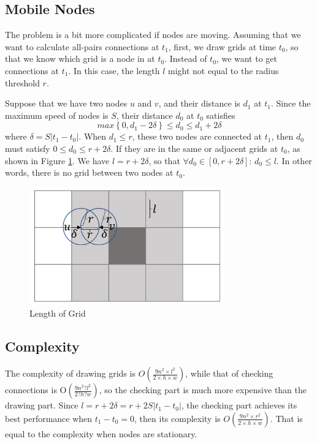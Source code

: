 \subsection{ Mobile Nodes}

\noindent The problem is a bit more complicated if nodes are moving. Assuming that we want to calculate all-pairs connections at $t_1$, first, we draw grids at time $t_0$, so that we know which grid is a node in at $t_0$. Instead of $t_0$, we want to get connections at $t_1$. In this case, the length $l$ might not equal to the radius threshold $r$.

Suppose that we have two nodes $u$ and $v$, and their distance is $d_1$ at $t_1$. Since the maximum speed of nodes is $S$, their distance $d_0$ at $t_0$ satisfies
\[max\left\{0,d_1-2\delta \right\}\le d_0\le d_1+2\delta \] 
where $\delta =S\left|t_1-t_0\right|$. When $d_1\le r$, these two nodes are connected at $t_1$, then $d_0$ must satisfy $0\le d_0\le r+2\delta $. If they are in the same or adjacent grids at $t_0$, as shown in Figure \ref{fig:F54LengthofGrid}. We have $l=r+2\delta $, so that $\mathrm{\forall }d_0\in \left[0,r+2\delta \right]$: $d_0\le l$. In other words, there is no grid between two nodes at $t_0$. 

\begin{figure} [hbtp]
  \centering 
  \includegraphics[height=2in]{figures/F54LengthofGrid.png}
  \caption{Length of Grid} 
  \label{fig:F54LengthofGrid} %
\end{figure}

\subsection{Complexity}

\noindent The complexity of drawing grids is $O\left(\frac{9n^2\times l^2}{2\times h\times w}\right)$, while that of checking connections is $\mathrm{O}\left(\frac{9n^2\mathrm{?}l^2}{2\mathrm{?}h\mathrm{?}w}\right)$, so the checking part is much more expensive than the drawing part. Since $l=r+2\delta =r+2S\left|t_1-t_0\right|$, the checking part achieves its best performance when $t_1-t_0=0$, then its complexity is $O\left(\frac{9n^2\times r^2}{2\times h\times w}\right)$. That is equal to the complexity when nodes are stationary.
















